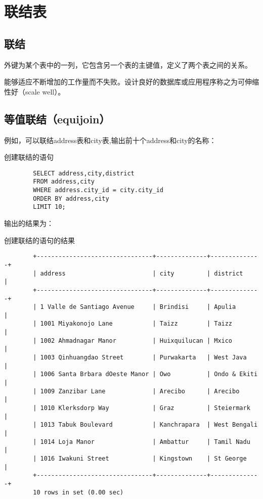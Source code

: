 \documentclass[UTF8]{article}
\begin{document}
\section{联结表}
\subsection{联结}

\begin{redbox}[frametitle={Defination 15.1.1 外键（foreign key）}]
        外键为某个表中的一列，它包含另一个表的主键值，定义了两个表之间的关系。
\end{redbox}

\begin{redbox}[frametitle={Defination 15.1.2 可伸缩性（scale）}]
        能够适应不断增加的工作量而不失败。设计良好的数据库或应用程序称之为可伸缩性好（scale well）。
\end{redbox}

\subsection{等值联结（equijoin）}

例如，可以联结address表和city表,输出前十个address和city的名称：

\begin{listing}[H]
        \caption{创建联结的语句}
	\label{code:createjoinclause}
\begin{verbatim}
        SELECT address,city,district 
        FROM address,city 
        WHERE address.city_id = city.city_id 
        ORDER BY address,city 
        LIMIT 10;
\end{verbatim}
\end{listing}

输出的结果为：

\begin{listing}[H]
	\caption{创建联结的语句的结果}
	\label{code:createjoinclauseresult}
\begin{verbatim}
        +--------------------------------+--------------+--------------+
        | address                        | city         | district     |
        +--------------------------------+--------------+--------------+
        | 1 Valle de Santiago Avenue     | Brindisi     | Apulia       |
        | 1001 Miyakonojo Lane           | Taizz        | Taizz        |
        | 1002 Ahmadnagar Manor          | Huixquilucan | Mxico        |
        | 1003 Qinhuangdao Street        | Purwakarta   | West Java    |
        | 1006 Santa Brbara dOeste Manor | Owo          | Ondo & Ekiti |
        | 1009 Zanzibar Lane             | Arecibo      | Arecibo      |
        | 1010 Klerksdorp Way            | Graz         | Steiermark   |
        | 1013 Tabuk Boulevard           | Kanchrapara  | West Bengali |
        | 1014 Loja Manor                | Ambattur     | Tamil Nadu   |
        | 1016 Iwakuni Street            | Kingstown    | St George    |
        +--------------------------------+--------------+--------------+
        10 rows in set (0.00 sec)
\end{verbatim}
\end{listing}
\end{document}
